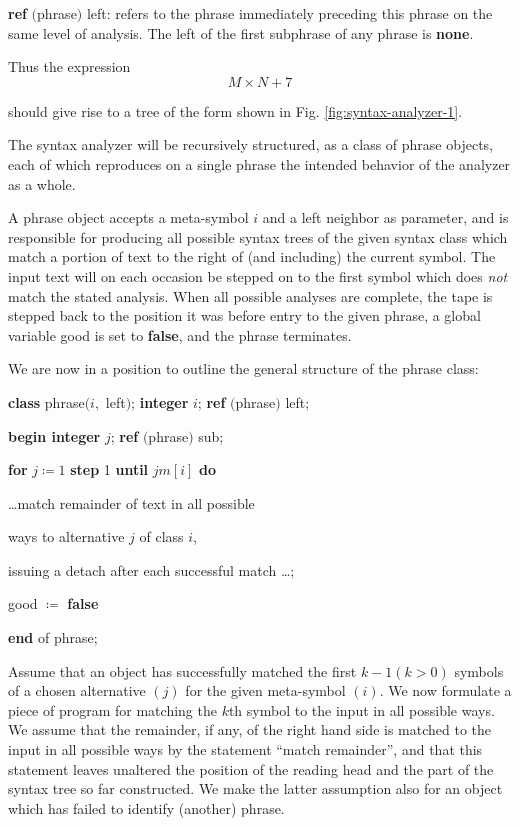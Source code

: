 \documentclass[twoside,11pt]{book}
\begin{document}
\parindent\quad \textbf{ref} $($phrase$)$ left: refers to the phrase immediately preceding this phrase on the same level of analysis. The left of the first subphrase of any phrase is \textbf{none}.

\noindent
Thus the expression
$$
M\times N + 7
$$

\noindent
should give rise to a tree of the form shown in Fig. \ref{fig:syntax-analyzer-1}.

The syntax analyzer will be recursively structured, as a class of phrase objects, each of which reproduces on a single phrase the intended behavior of the analyzer as a whole.

A phrase object accepts a meta-symbol $i$ and a left neighbor as parameter, and is responsible for producing all possible syntax trees of the given syntax class which match a portion of text to the right of (and including) the current symbol. The input text will on each occasion be stepped on to the first symbol which does \textit{not} match the stated analysis. When all possible analyses are complete, the tape is stepped back to the position it was before entry to the given phrase, a global variable good is set to \textbf{false}, and the phrase terminates.

We are now in a position to outline the general structure of the phrase class:

\quad \textbf{class} phrase$(i,$ left$)$; \textbf{integer} $i$; \textbf{ref} $($phrase$)$ left;

\quad \quad \textbf{begin integer} $j$; \textbf{ref} $($phrase$)$ sub;

\quad \quad \quad \textbf{for} $j\coloneq 1$ \textbf{step} 1 \textbf{until} $jm[i]$ \textbf{do}

\quad \quad \quad \quad \dots match remainder of text in all possible

\quad \quad \quad \quad ways to alternative $j$ of class $i$,

\quad \quad \quad \quad issuing a detach after each successful match \dots;

\quad \quad \quad good $\coloneq$ \textbf{false}

\quad \textbf{end} of phrase;

Assume that an object has successfully matched the first $k - 1(k > 0)$ symbols of a chosen alternative $(j)$ for the given meta-symbol $(i)$. We now formulate a piece of program for matching the $k$th symbol to the input in all possible ways. We assume that the remainder, if any, of the right hand side is matched to the input in all possible ways by the statement ``match remainder'', and that this statement leaves unaltered the position of the reading head and the part of the syntax tree so far constructed. We make the latter assumption also for an object which has failed to identify (another) phrase.
\end{document}
